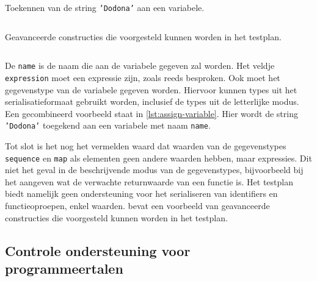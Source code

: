 \begin{listing}
    \caption{Toekennen van de string \texttt{'Dodona'} aan een variabele.}
    \label{lst:assign-variable}
    \inputminted{json}{code/assign-variable.json}
\end{listing}

\begin{listing}
    \caption{Geavanceerde constructies die voorgesteld kunnen worden in het testplan.}
    \label{lst:advanced-expressions}
    \inputminted{java}{code/advanced.jshell}
\end{listing}

De \texttt{name} is de naam die aan de variabele gegeven zal worden.
Het veldje \texttt{expression} moet een expressie zijn, zoals reeds besproken.
Ook moet het gegevenstype van de variabele gegeven worden.
Hiervoor kunnen types uit het serialisatieformaat gebruikt worden, inclusief de types uit de letterlijke modus.
Een gecombineerd voorbeeld staat in \cref{lst:assign-variable}.
Hier wordt de string \texttt{'Dodona'} toegekend aan een variabele met naam \texttt{name}.

Tot slot is het nog het vermelden waard dat waarden van de gegevenstypes \texttt{sequence} en \texttt{map} als elementen geen andere waarden hebben, maar expressies.
Dit niet het geval in de beschrijvende modus van de gegevenstypes, bijvoorbeeld bij het aangeven wat de verwachte returnwaarde van een functie is.
Het testplan biedt namelijk geen ondersteuning voor het serialiseren van identifiers en functieoproepen, enkel waarden.
 bevat een voorbeeld van geavanceerde constructies die voorgesteld kunnen worden in het testplan.

\subsection{Controle ondersteuning voor programmeertalen}\label{subsec:vereiste-functies}

